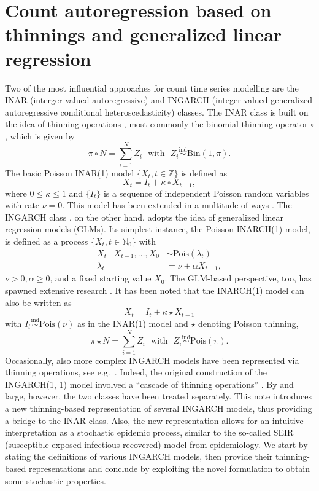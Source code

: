 \documentclass{article}
\begin{document}
\section{Count autoregression based on thinnings and generalized linear regression}
\label{sec:intro}

Two of the most influential approaches for count time series modelling are the INAR (interger-valued autoregressive) and INGARCH (integer-valued generalized autoregressive conditional heteroscedasticity) classes. The INAR class is built on the idea of thinning operations \citep{Steutel1979}, most commonly the binomial thinning operator $\circ$, which is given by
$$
\pi \circ N = \sum_{i = 1}^N Z_i \ \ \ \text{with} \ \ \ Z_i \stackrel{\text{ind}}{\sim} \text{Bin}(1, \pi).
$$
The basic Poisson INAR(1) model $\{X_t, t \in \mathbb{Z}\}$ \citep{McKenzie1985, Al-Osh1987} is defined as
$$
X_t = I_t + \kappa \circ X_{t - 1},
$$
where $0 \leq \kappa \leq 1$ and $\{I_t\}$ is a sequence of independent Poisson random variables with rate $\nu = 0$. This model has been extended in a multitude of ways \cite{Scotto2015}. The INGARCH class \cite{Ferland2006, Fokianos2009}, on the other hand, adopts the idea of generalized linear regression models (GLMs). Its simplest instance, the Poisson INARCH(1) model, is defined as a process $\{X_t, t \in \mathbb{N}_0\}$ with
\begin{align*}
X_t \mid X_{t - 1}, \dots, X_0 & \sim \text{Pois}(\lambda_t)\\
\lambda_t & = \nu + \alpha X_{t - 1},
\end{align*}
$\nu > 0, \alpha \geq 0$, and a fixed starting value $X_0$. The GLM-based perspective, too, has spawned extensive research \citep{Fokianos2016}. It has been noted that the INARCH(1) model can also be written as \citep{Weiss2015}
$$
X_t = I_t + \kappa \star X_{t- 1}
$$
with $I_t \stackrel{\text{ind}}{\sim} \text{Pois}(\nu)$ as in the INAR(1) model and $\star$ denoting Poisson thinning,
$$
\pi \star N = \sum_{i = 1}^N Z_i \ \ \ \text{with} \ \ \ Z_i \stackrel{\text{ind}}{\sim} \text{Pois}(\pi).
$$
Occasionally, also more complex INGARCH models have been represented via thinning operations, see e.g.\ \citep{Lu2021}. Indeed, the original construction of the INGARCH(1, 1) model involved a ``cascade of thinning operations'' \citep[p.927]{Ferland2006}. By and large, however, the two classes have been treated separately. This note introduces a new thinning-based representation of several INGARCH models, thus providing a bridge to the INAR class. Also, the new representation allows for an intuitive interpretation as a stochastic epidemic process, similar to the so-called SEIR (susceptible-exposed-infectious-recovered) model from epidemiology. We start by stating the definitions of various INGARCH models, then provide their thinning-based representations and conclude by exploiting the novel formulation to obtain some stochastic properties.
 
\end{document}
